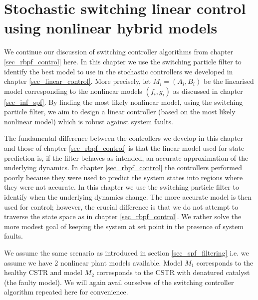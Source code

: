 \chapter{Stochastic switching linear control using nonlinear hybrid models}
\label{sec_spf_control}
We continue our discussion of switching controller algorithms from chapter \ref{sec_rbpf_control} here. In this chapter we use the switching particle filter to identify the best model to use in the stochastic controllers we developed in chapter \ref{sec_linear_control}. More precisely, let $M_i = (A_i, B_i)$ be the linearised model corresponding to the nonlinear models $(f_i, g_i)$ as discussed in chapter \ref{sec_inf_spf}. By finding the most likely nonlinear model, using the switching particle filter, we aim to design a linear controller (based on the most likely nonlinear model) which is robust against system faults.

The fundamental difference between the controllers we develop in this chapter and those of chapter \ref{sec_rbpf_control} is that the linear model used for state prediction is, if the filter behaves as intended, an accurate approximation of the underlying dynamics. In chapter \ref{sec_rbpf_control} the controllers performed poorly because they were used to predict the system states into regions where they were not accurate. In this chapter we use the switching particle filter to identify when the underlying dynamics change. The more accurate model is then used for control; however, the crucial difference is that we do not attempt to traverse the state space as in chapter \ref{sec_rbpf_control}. We rather solve the more modest goal of keeping the system at set point in the presence of system faults. 

We assume the same scenario as introduced in section \ref{sec_spf_filtering} i.e. we assume we have 2 nonlinear plant models available. Model $M_1$ corresponds to the healthy CSTR and model $M_2$ corresponds to the CSTR with denatured catalyst (the faulty model). We will again avail ourselves of the switching controller algorithm  repeated here for convenience.

